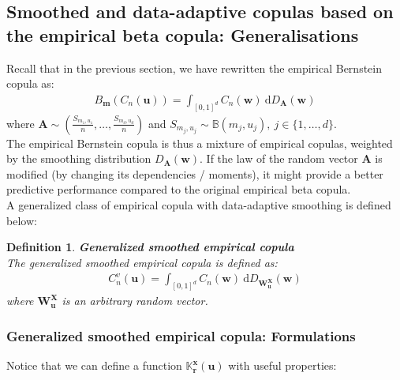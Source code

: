 \documentclass[12pt]{report}
\newtheorem{definition}{Definition}[subsection]
\newcommand{\1}{\mathbf{1}}
\begin{document}
\begin{flushleft}
\newpage
\subsection{Smoothed and data-adaptive copulas based on the empirical beta copula: Generalisations}
\vspace{0.5cm}

Recall that in the previous section, we have rewritten the empirical Bernstein copula as:
\begin{align*}
B_{\boldsymbol{m}}(C_{n}(\boldsymbol{u})) = \int_{[0,1]^d} C_{n}(\boldsymbol{w})  \: \mathrm{d} D_{\boldsymbol{A}}(\boldsymbol{w}) 
\end{align*}
where $\boldsymbol{A} \sim \left(\frac{S_{m_{1},u_{1}}}{n}, \dots, \frac{S_{m_{d},u_{d}}}{n}\right)$ and $S_{m_{j},u_{j}} \sim \mathbb{B}(m_{j},u_{j}), \: j \in \{1, \dots, d \}$. \\
\vspace{0.5cm}
The empirical Bernstein copula is thus a mixture of empirical copulas, weighted by the smoothing distribution $D_{\boldsymbol{A}}(\boldsymbol{w})$. If the law of the random vector $\boldsymbol{A}$ is modified (by changing its dependencies / moments), it might provide a better predictive performance compared to the original empirical beta copula. \\
\vspace{0.5cm}
A generalized class of empirical copula with data-adaptive smoothing is defined below:

\begin{definition}\label{SmoothECDefinition}
\textit{\normalfont\parencite{KojadinovicYi2024Smooth}}\:
\textbf{Generalized smoothed empirical copula} \\
The generalized smoothed empirical copula is defined as:
\begin{align*}
C_{n}^{v}(\textbf{u}) = \int_{[0,1]^d} C_{n}(\textbf{w}) \: \mathrm{d}D_{\boldsymbol{W}_{\boldsymbol{u}}^{\boldsymbol{X}}}(\boldsymbol{w})
\end{align*}
where $\textbf{W}^{\textbf{X}}_{\textbf{u}}$ is an arbitrary random vector.
\end{definition}

\newpage
\subsubsection{Generalized smoothed empirical copula: Formulations}
\vspace{0.5cm}
Notice that we can define a function $\mathds{K}_{\textbf{r}}^{\textbf{x}}(\textbf{u})$ with useful properties:


\end{flushleft}
\end{document}
